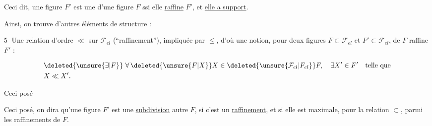 
Ceci dit, une figure $F'$ est une  d'une figure $F$ ssi elle \uline{raffine} $F'$, et  \uline{elle a  support}. 

Ainsi, on trouve d'autres éléments de structure :

\textcircled{5} Une relation d'ordre $\ll$ sur $\mathcal{F}_{el}$ (``raffinement''), impliquée par $\leq$, d'où une notion, pour deux figures $F\subset\mathcal{F}_{el}$ et $F'\subset\mathcal{F}_{el}$, de $F$ raffine $F'$ :

\[
\begin{aligned}
&\deleted{\unsure{\exists|F}}\ \forall\,\deleted{\unsure{F|X}}X\in\deleted{\unsure{\mathcal{F}_{el}|F_{el}}}F,\quad \exists X'\in F'\quad\text{telle que}\\
&X\ll X'.
\end{aligned}
\]

Ceci posé





Ceci posé, on dira qu'une figure $F'$ est une \uline{subdivision}  autre $F$, si c'est un \uline{raffinement}, et si elle est maximale, pour la relation $\subset$, parmi les raffinements de $F$.
